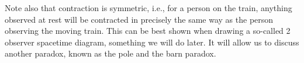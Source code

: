 \documentclass[12pt]{article}
\begin{document}
\noindent 
Note also that contraction is symmetric, i.e., for a person on the train, anything observed at rest will be contracted in precisely the same way as the person observing the moving train. This can be best shown when drawing a so-called 2 observer spacetime diagram, something we will do later. It will allow us to discuss another paradox, known as the pole and the barn paradox.  











\end{document}
